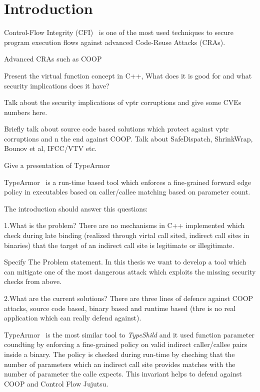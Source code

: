 \chapter{Introduction}
\label{chapter:Introduction}
Control-Flow Integrity (CFI)~\cite{abadi:cfi2, abadi:cfi} is one of the most used techniques
to secure program execution flows against advanced Code-Reuse Attacks (CRAs).

Advanced CRAs such as COOP~\cite{schuster:coop}

Present the virtual function concept in C++, What does it is good for and what security implications does it have?

Talk about the security implications of vptr corruptions and give some CVEs numbers here.

Briefly talk about source code based solutions which protect against vptr corruptions and n the 
end against COOP. Talk about SafeDispatch, ShrinkWrap, Bounov et al, IFCC/VTV etc.


Give a presentation of TypeArmor

TypeArmor~\cite{veen:typearmor} is a run-time based
tool which enforces a fine-grained forward edge policy
in executables based on caller/callee matching based on 
parameter count. 

The introduction should answer this questions:

1.What is the problem? 
There are no mechanisms in C++ implemented which check during late binding
(realized through virtal call sited, indirect call sites in binaries) that
the target of an indirect call site is legitimate or illegitimate.

Specify The Problem statement. 
In this thesis we want to develop a tool which can mitigate one 
of the most dangerous attack which exploits the missing security checks from above.

2.What are the current solutions?
There are three lines of defence against COOP attacks, source code based,
binary based and runtime based (thre is no real application which can really defend against).

TypeArmor~\cite{veen:typearmor} is the most similar tool to \textit{TypeShild} and it used
function parameter coundting by enforcing a fine-grained policy on valid indirect caller/callee pairs
inside a binary. The policy is checked during run-time by cheching that the number of parameters which 
an indirect call site provides matches with the number of parameter the calle expects. This invariant
helps to defend against COOP and Control Flow Jujutsu.

